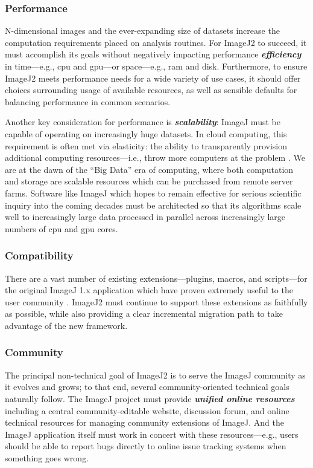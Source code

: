 \documentclass{bmcart}
\begin{document}
\subsubsection*{Performance}
N-dimensional images and the ever-expanding size of datasets increase the
computation requirements placed on analysis routines. For ImageJ2 to succeed,
it must accomplish its goals without negatively impacting performance
\textbf{\textit{efficiency}} in time---e.g., \acrfull{cpu} and
\acrfull{gpu}---or space---e.g., \acrfull{ram} and disk. Furthermore, to ensure
ImageJ2 meets performance needs for a wide variety of use cases, it should
offer choices surrounding usage of available resources, as well as sensible
defaults for balancing performance in common scenarios.

Another key consideration for performance is \textbf{\textit{scalability}}:
ImageJ must be capable of operating on increasingly huge datasets. In cloud
computing, this requirement is often met via elasticity: the ability to
transparently provision additional computing resources---i.e., throw more
computers at the problem \cite{hardware_is_cheap}. We are at the dawn of the
``Big Data'' era of computing, where both computation and storage are scalable
resources which can be purchased from remote server farms. Software like ImageJ
which hopes to remain effective for serious scientific inquiry into the coming
decades must be architected so that its algorithms scale well to increasingly
large data processed in parallel across increasingly large numbers of
\acrshort{cpu} and \acrshort{gpu} cores.

\subsubsection*{Compatibility}
There are a vast number of existing extensions---plugins, macros, and
scripts---for the original ImageJ 1.x application which have proven extremely
useful to the user community \cite{imagej_ecosystem}. ImageJ2 must continue to
support these extensions as faithfully as possible, while also providing a
clear incremental migration path to take advantage of the new framework.

\subsubsection*{Community}
The principal non-technical goal of ImageJ2 is to serve the ImageJ community as
it evolves and grows; to that end, several community-oriented technical goals
naturally follow. The ImageJ project must provide \textbf{\textit{unified
online resources}} including a central community-editable website, discussion
forum, and online technical resources for managing community extensions of
ImageJ. And the ImageJ application itself must work in concert with these
resources---e.g., users should be able to report bugs directly to online issue
tracking systems when something goes wrong.
\end{document}
